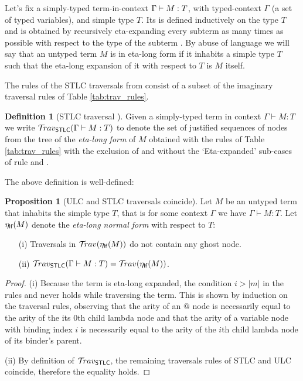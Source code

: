 \documentclass{article}
\theoremstyle{definition}
\newtheorem{definition}{Definition}[section]
\newtheorem{proposition}{Proposition}[section]
\newcommand{\ghostlmd}{{\lambda\!\!\lambda}}
\newcommand{\travulc}{\travset}
\newcommand{\travstlc}{{\travset_{\sf STLC}}}
\begin{document}
Let's fix a simply-typed term-in-context $\Gamma \vdash M :T$, with typed-context $\Gamma$ (a set of typed variables), and simple type $T$. Its  is defined inductively on the type $T$ and is obtained by recursively eta-expanding every subterm as many times as possible with respect to the type of the subterm \cite{Ong2006,BlumPhd}.
By abuse of language we will say that an untyped term $M$ is in eta-long form if it inhabits a simple type $T$ such that the eta-long expansion of it with respect to $T$ is $M$ itself.

The rules of the STLC traversals from \cite{BlumPhd} consist of a subset of the imaginary traversal rules of Table \ref{tab:trav_rules}.

\begin{definition}[STLC traversal \cite{BlumPhd}]
Given a simply-typed term in context $\Gamma \vdash M : T$ we write $\travstlc(\Gamma \vdash M : T)$ to denote the set of justified sequences of nodes from the tree of the \emph{eta-long form} of $M$ obtained with the rules of Table \ref{tab:trav_rules} with the exclusion of \rulenamet{Lam^\ghostlmd} and without the `Eta-expanded' sub-cases of rule  and .
\end{definition}

The above definition is well-defined:
\begin{proposition}[ULC and STLC traversals coincide]
\label{prop:ulc_and_stlc_trav_coincide}
Let $M$ be an untyped term that inhabits the simple type $T$, that is for some context $\Gamma$ we have $\Gamma \vdash M : T$. Let $\eta_{\sf lf}(M)$ denote the \emph{eta-long normal form} with respect to $T$:
\begin{itemize}
\item[(i)] Traversals in $\travulc(\etalf{M})$ do not contain any ghost node.
\item[(ii)] $\travstlc(\Gamma \vdash M : T) = \travulc(\etalf{M})$.
\end{itemize}
\end{proposition}
\begin{proof}
(i) Because the term is eta-long expanded, the condition $i>|m|$ in the rules  and  never holds while traversing the term.  This is shown by induction on the traversal rules, observing that the arity of an $@$ node is necessarily equal to the arity of the its $0$th child lambda node and that the arity of a variable node with binding index $i$ is necessarily equal to the arity of the $i$th child lambda node of its binder's parent.

(ii) By definition of $\travstlc$, the remaining traversals rules of STLC and ULC coincide, therefore the equality holds.
\end{proof}
\end{document}
